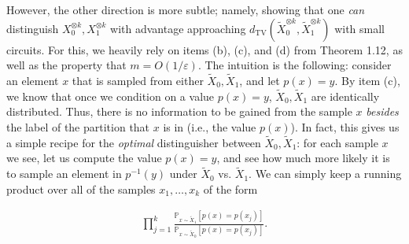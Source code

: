 However, the other direction is more subtle; namely, showing that one \emph{can} distinguish $X_{0}^{\otimes k},X_{1}^{\otimes k}$ with advantage approaching $d_{\mathrm{TV}}(\widetilde{X}_{0}^{\otimes k},\widetilde{X}_{1}^{\otimes k})$ with small circuits. For this, we heavily rely on items (b), (c), and (d) from Theorem 1.12, as well as the property that $m=O(1/\varepsilon)$. The intuition is the following: consider an element $x$ that is sampled from either $\widetilde{X}_{0},\widetilde{X}_{1}$, and let $p(x)=y$. By item (c), we know that once we condition on a value $p(x)=y$, $\widetilde{X}_{0},\widetilde{X}_{1}$ are identically distributed. Thus, there is no information to be gained from the sample $x$ \emph{besides} the label of the partition that $x$ is in (i.e., the value $p(x)$). In fact, this gives us a simple recipe for the \emph{optimal} distinguisher between $\widetilde{X}_{0},\widetilde{X}_{1}$: for each sample $x$ we see, let us compute the value $p(x)=y$, and see how much more likely it is to sample an element in $p^{-1}(y)$ under $\widetilde{X}_{0}$ vs. $\widetilde{X}_{1}$. We can simply keep a running product over all of the samples $x_{1},\dots,x_{k}$ of the form\par


\[\begin{gathered}
\prod_{j=1}^{k}\frac{\mathbb{P}_{x\sim\widetilde{X}_{1}}[p(x)=p(x_{j})]}{\mathbb{P}_{x\sim\widetilde{X}_{0}}[p(x)=p(x_{j})]}.
\end{gathered}\]





